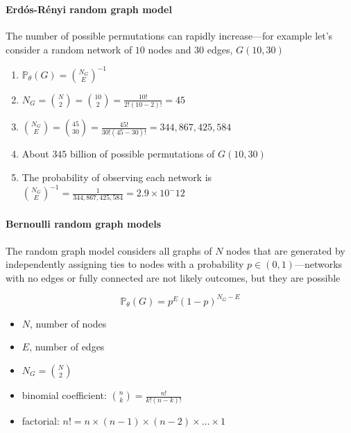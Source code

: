\documentclass[8pt]{beamer}
\begin{document}
\begin{frame}
\frametitle{\insertsection}
\framesubtitle{Erd\'os-R\'enyi random graph model}

The number of possible permutations can rapidly increase---for example let's consider a random network of $10$ nodes and $30$ edges, $G(10,30)$

\begin{enumerate}
\item $\mathbb{P}_{\theta}(G)={\binom{N_{G}}{E}}^{-1}$
\item $N_{G}= \binom{N}{2} = \binom{10}{2} = \frac{10!}{2!(10-2)!}= 45$
\item $\binom{N_{G}}{E} = \binom{45}{30} = \frac{45!}{30!(45-30)!}=344,867,425,584$
\item About $345$ billion of possible permutations of $G(10,30)$
\item The probability of observing each network is ${\binom{N_{G}}{E}}^{-1}=\frac{1}{344,867,425,584} = 2.9\times10^-12$
\end{enumerate}

\end{frame}


\begin{frame}
\frametitle{\insertsection}
\framesubtitle{Bernoulli random graph models}

The {\color{blue}{Bernoulli}} random graph model considers all graphs of $N$ nodes that are generated by independently assigning ties to nodes with a probability $p\in(0,1)$---networks with no edges or fully connected are not likely outcomes, but they are possible

\begin{equation*}
\mathbb{P}_{\theta}(G)=p^E(1-p)^{N_{G}-E}
\end{equation*}

\begin{itemize}
\item $N$, number of nodes
\item $E$, number of edges
\item $N_{G}= \binom{N}{2}$
\item binomial coefficient: $\binom{n}{k}=\frac{n!}{k!(n-k)!}$
\item factorial: $n!=n\times(n-1)\times(n-2)\times\ldots\times1$
\end{itemize}

\end{frame}
\end{document}

